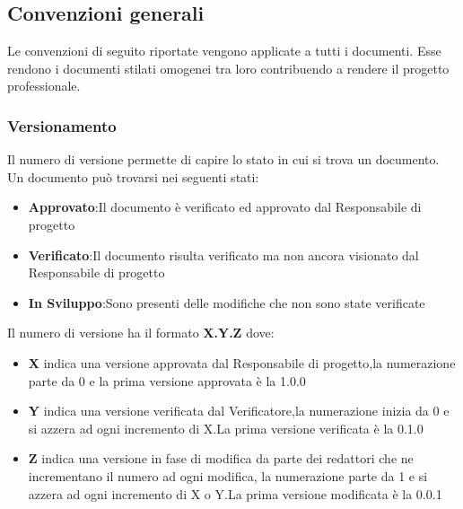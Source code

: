 \subsection{Convenzioni generali}
Le convenzioni di seguito riportate vengono applicate a tutti i documenti.
Esse rendono i documenti stilati omogenei tra loro contribuendo a rendere il progetto professionale.

\subsubsection{Versionamento}
Il numero di versione permette di capire lo stato in cui si trova un documento.
Un documento può trovarsi nei seguenti stati:
\begin{itemize} 
    \item \textbf{Approvato}:Il documento è verificato ed approvato dal Responsabile di progetto
    \item \textbf{Verificato}:Il documento risulta verificato ma non ancora visionato dal Responsabile di progetto
    \item \textbf{In Sviluppo}:Sono presenti delle modifiche che non sono state verificate
\end{itemize}
Il numero di versione ha il formato \textbf{X.Y.Z} dove:
\begin{itemize} 
    \item \textbf{X} indica una versione approvata dal Responsabile di progetto,la numerazione parte da 0
    e la prima versione approvata è la 1.0.0
    \item \textbf{Y} indica una versione verificata dal Verificatore,la numerazione inizia da 0 e si azzera ad ogni incremento di X.La prima versione
    verificata è la 0.1.0
    \item \textbf{Z} indica una versione in fase di modifica da parte dei redattori che ne incrementano il numero ad ogni modifica,
    la numerazione parte da 1 e si azzera ad ogni incremento di X o Y.La prima versione modificata è la 0.0.1
\end{itemize}

